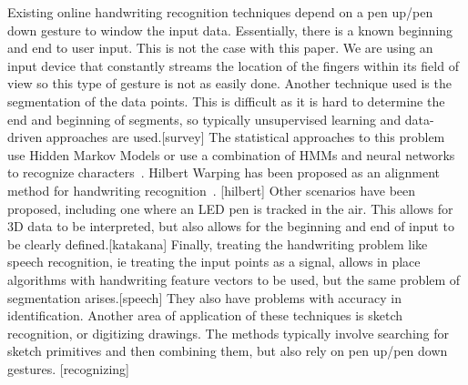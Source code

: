 Existing online handwriting recognition techniques depend on a pen up/pen down gesture to window the input data. Essentially, there is a known beginning and end to user input. This is not the case with this paper. We are using an input device that constantly streams the location of the fingers within its field of view so this type of gesture is not as easily done. Another technique used is the segmentation of the data points. This is difficult as it is hard to determine the end and beginning of segments, so typically unsupervised learning and data-driven approaches are used.[survey] The statistical approaches to this problem use Hidden Markov Models or use a combination of HMMs and neural networks to recognize characters~\cite{plotz2009markov}. Hilbert Warping has been proposed as an alignment method for handwriting recognition~\cite{ishida2010hilbert}. [hilbert] Other scenarios have been proposed, including one where an LED pen is tracked in the air. This allows for 3D data to be interpreted, but also allows for the beginning and end of input to be clearly defined.[katakana] Finally, treating the handwriting problem like speech recognition, ie treating the input points as a signal, allows in place algorithms with handwriting feature vectors to be used, but the same problem of segmentation arises.[speech] They also have problems with accuracy in identification. 
Another area of application of these techniques is sketch recognition, or digitizing drawings. The methods typically involve searching for sketch primitives and then combining them, but also rely on pen up/pen down gestures. [recognizing]
